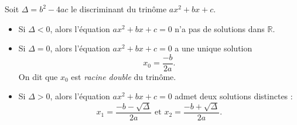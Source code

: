 \documentclass[11pt]{article}
\begin{document}
\begin{prop}
  Soit $\Delta=b^2-4ac$ le discriminant du trinôme $ax^2+bx+c$.
  \begin{itemize}
    \item Si $\Delta<0$, alors l'équation $ax^2+bx+c=0$ n'a pas de solutions
      dans $\mathbb{R}$.
    \item Si $\Delta=0$, alors l'équation $ax^2+bx+c=0$ a une unique solution
      \[x_0 = \frac{-b}{2a}.\] On dit que $x_0$ est \emph{racine double} du trinôme.
    \item Si $\Delta>0$, alors l'équation $ax^2+bx+c=0$ admet deux solutions
      distinctes : 
      \[
        x_1=\frac{-b-\sqrt\Delta}{2a}
        \text{ et }
        x_2=\frac{-b+\sqrt\Delta}{2a}.
      \]
  \end{itemize}
\end{prop}
\end{document}
